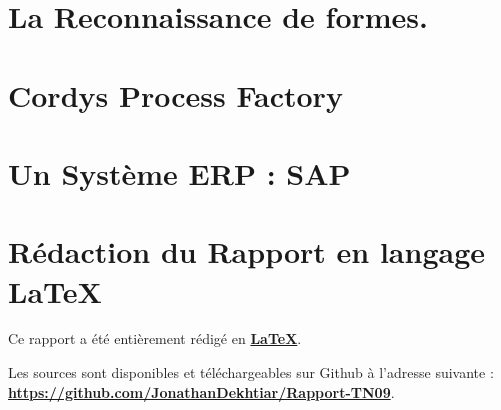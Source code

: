 \documentclass[12pt,a4paper,utf8x, combine]{report}
\begin{document}



\tableofcontents
\listoffigures
\clearpage










\chapter{La Reconnaissance de formes.}


\clearpage

\chapter{Cordys Process Factory}



\clearpage

\chapter{Un Système ERP : SAP}





\clearpage




\nocite{*}



\printindex

\appendix

\pagebreak

\chapter*{Rédaction du Rapport en langage LaTeX}
Ce rapport a été entièrement rédigé en \href{http://fr.wikipedia.org/wiki/LaTeX}{\textbf{LaTeX}}. 

Les sources sont disponibles et téléchargeables sur Github à l'adresse suivante :\\
\href{https://github.com/JonathanDekhtiar/Rapport-TN09}{\textbf{https://github.com/JonathanDekhtiar/Rapport-TN09}}. 
\end{document}
